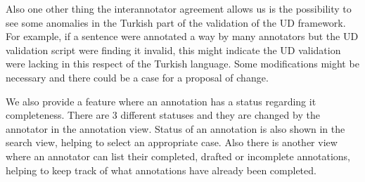 
Also one other thing the interannotator agreement allows us is the possibility to see some anomalies in the Turkish part of the validation of the UD framework.
For example, if a sentence were annotated a way by many annotators but the UD validation script were finding it invalid, this might indicate the UD validation were lacking in this respect of the Turkish language.
Some modifications might be necessary and there could be a case for a proposal of change.

We also provide a feature where an annotation has a status regarding it completeness.
There are 3 different statuses and they are changed by the annotator in the annotation view.
Status of an annotation is also shown in the search view, helping to select an appropriate case.
Also there is another view where an annotator can list their completed, drafted or incomplete annotations, helping to keep track of what annotations have already been completed.
